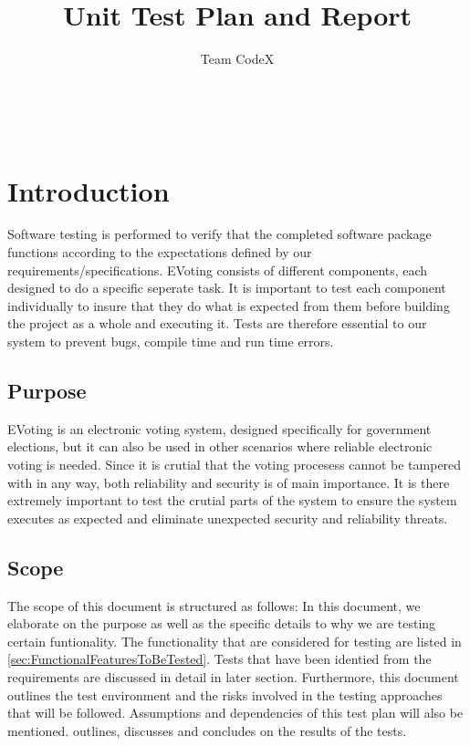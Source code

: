 \documentclass[11pt]{article}
\author{Team CodeX}
\title{Unit Test Plan and Report}
\begin{document}
	\setcounter{tocdepth}{6}
	\setcounter{secnumdepth}{6}
	\setlength{\parskip}{6pt}
	
	
	
	\renewcommand{\thesection}{\arabic{section}}
	\newpage
	
	\tableofcontents
	
	\textsc{}\\[1cm]
	
	\newpage
	
	\section{Introduction}
	Software testing is performed to verify that the completed software package functions according to the expectations defined by our requirements/specifications.\newline
	EVoting consists of different components, each designed to do a specific seperate task. It is important to test each component individually to insure that they do what is expected from them before building the project as a whole and executing it. Tests are therefore essential to our system to prevent bugs, compile time and run time errors.
	
	\subsection{Purpose}
	EVoting is an electronic voting system, designed specifically for government elections, but it can also be used in other scenarios where reliable electronic voting is needed. Since it is crutial that the voting procesess cannot be tampered with in any way, both reliability and security is of main importance. It is there extremely important to test the crutial parts of the system to ensure the system executes as expected and eliminate unexpected security and reliability threats.
	\subsection{Scope}
	The scope of this document is structured as follows:\newline
	In this document, we elaborate on the purpose as well as the specific details to why we are testing certain funtionality. The functionality that are considered for
	testing are listed in \autoref{sec:FunctionalFeaturesToBeTested}. Tests that have been identied from the requirements are discussed in detail in later section. Furthermore, this document outlines the test environment and the risks involved in the testing approaches that will be followed. Assumptions and
	dependencies of this test plan will also be mentioned.  outlines, discusses and concludes on the results of the tests.
\end{document}
